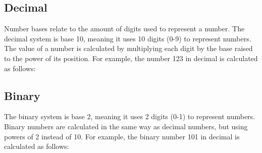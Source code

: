 \documentclass{article}
\begin{document}
\subsection*{Decimal}

\noindent Number bases relate to the amount of digits used to represent a number. 
The decimal system is base 10, meaning it uses 10 digits (0-9) to represent numbers. 
The value of a number is calculated by multiplying each digit by the base raised to the power of its position. 
For example, the number 123 in decimal is calculated as follows:

\vspace{0.5cm}


\vspace*{0.5cm}

\subsection*{Binary}

\noindent The binary system is base 2, meaning it uses 2 digits (0-1) to represent numbers. Binary numbers are calculated in the same way as decimal numbers, but using powers of 2 instead of 10. For example, the binary number 101 in decimal is calculated as follows:

\vspace*{0.5cm}

\end{document}
